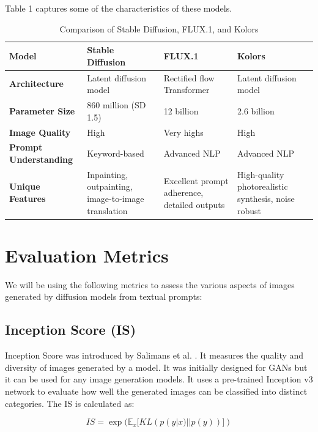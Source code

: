 \documentclass{article}
\begin{document}
Table 1 captures some of the characteristics of these models.

\begin{table}
  \centering
  \begin{tabular}{p{1.5in} p{1.5in} p{1.5in} p{1.5in}}
    \toprule
    \textbf{Model} & \textbf{Stable Diffusion} & \textbf{FLUX.1} & \textbf{Kolors} \\
    \midrule
    \textbf{Architecture} & Latent diffusion model & Rectified flow Transformer & Latent diffusion model \\
    \textbf{Parameter Size} & 860 million (SD 1.5) & 12 billion & 2.6 billion \\
    \textbf{Image Quality} & High & Very highs & High \\
    \textbf{Prompt Understanding} & Keyword-based & Advanced NLP & Advanced NLP \\
    \textbf{Unique Features} &
    Inpainting, outpainting, image-to-image translation & Excellent prompt adherence, detailed outputs & High-quality photorealistic synthesis, noise robust \\
    \bottomrule
  \end{tabular}
  \label{tab:comparison}
  \caption{Comparison of Stable Diffusion, FLUX.1, and Kolors}
\end{table}

\section{Evaluation Metrics}
We will be using the following metrics to assess the various aspects of images generated by diffusion models from textual prompts:

\subsection{Inception Score (IS)}

Inception Score was introduced by Salimans et al. \cite{salimans2016improved}. It measures the quality and diversity of images 
generated by a model. It was initially designed for GANs but it can be used for any image generation models. 
It uses a pre-trained Inception v3 network to evaluate how well the generated images can be classified into distinct categories. 
The IS is calculated as:

\begin{equation}
    IS = \exp(\mathbb{E}_x[KL(p(y|x) || p(y))])
\end{equation}
\end{document}
